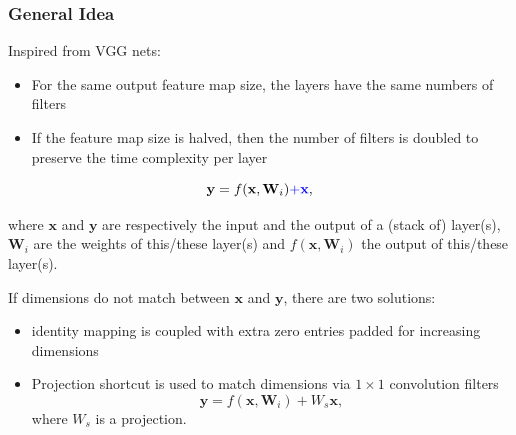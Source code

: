 \begin{frame}
	\frametitle{General Idea}

	Inspired from VGG nets:

	\smallskip
	\begin{itemize}
		\item For the same output feature map size, the layers have the same numbers of filters
		\item If the feature map size is halved, then the number of filters is doubled to preserve the time complexity per layer
	\end{itemize}
$$
\textbf{y} = f(\textbf{x}, \textbf{W}_i) \textcolor{blue}{+ \textbf{x}},
$$

\smallskip
where $\textbf{x}$ and $\textbf{y}$ are respectively the input and the output of a (stack of) layer(s), $\textbf{W}_i$ are the weights of this/these layer(s) and $f(\textbf{x}, \textbf{W}_i)$ the output of this/these layer(s).

\bigskip

If dimensions do not match between $\textbf{x}$ and $\textbf{y}$, there are two solutions:
\begin{itemize}
	\item identity mapping is coupled with extra zero entries padded for increasing dimensions
	\item Projection shortcut is used to match dimensions via $1 \times 1$ convolution filters
	$$
	\textbf{y} = f(\textbf{x}, \textbf{W}_i) + W_s \textbf{x},
	$$
	where $W_s$ is a projection.
\end{itemize}

\end{frame}


